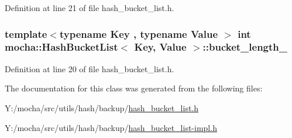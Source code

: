 Definition at line 21 of file hash\_\-bucket\_\-list.h.

\hypertarget{classmocha_1_1_hash_bucket_list_ab08a8f0ef01eaa9c53e82e308a78ddb6}{
\subsubsection[{bucket\_\-length\_\-}]{\setlength{\rightskip}{0pt plus 5cm}template$<$typename Key , typename Value $>$ int {\bf mocha::HashBucketList}$<$ Key, Value $>$::{\bf bucket\_\-length\_\-}}}
\label{classmocha_1_1_hash_bucket_list_ab08a8f0ef01eaa9c53e82e308a78ddb6}


Definition at line 20 of file hash\_\-bucket\_\-list.h.



The documentation for this class was generated from the following files:\begin{DoxyCompactItemize}
\item 
Y:/mocha/src/utils/hash/backup/\hyperlink{hash__bucket__list_8h}{hash\_\-bucket\_\-list.h}\item 
Y:/mocha/src/utils/hash/backup/\hyperlink{hash__bucket__list-impl_8h}{hash\_\-bucket\_\-list-\/impl.h}\end{DoxyCompactItemize}
